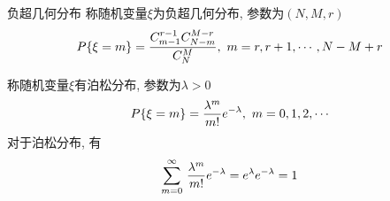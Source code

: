 \begin{negative_super_geometry_distru}{负超几何分布}
称随机变量\(\xi\)为负超几何分布, 参数为\((N, M, r)\)
\begin{align}
P\{\xi = m\} = {C_{m-1}^{r-1}C_{N-m}^{M-r}\over C_{N}^{M}},\,\, m =r, r+1, \cdots, N-M+r
\end{align}
\end{negative_super_geometry_distru}

\begin{poisson_distru}[泊松分布]
称随机变量\(\xi\)有泊松分布, 参数为\(\lambda > 0\)
\begin{align}
P\{\xi = m\} = {\lambda^m\over m!}e^{-\lambda},\,\, m = 0, 1, 2, \cdots
\end{align}
对于泊松分布, 有
\begin{align*}
\sum\limits_{m = 0}^\infty\,{\lambda^m\over m!}e^{-\lambda} = e^\lambda e^{-\lambda} = 1
\end{align*}
\end{poisson_distru}

